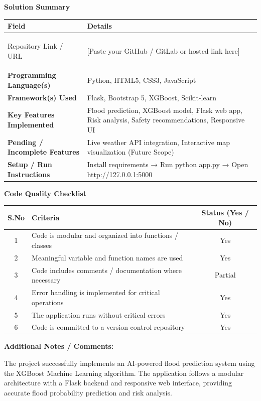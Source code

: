 \documentclass[11pt, a4paper]{article}
\begin{document}
\textbf{Solution Summary}

\noindent
\begin{longtable}{|>{\bfseries}p{}|p{}|}
\hline
Field & \textbf{Details} \\ \hline
\endfirsthead
\endhead %
\endfoot %
\endlastfoot

Repository Link / URL & [Paste your GitHub / GitLab or hosted link here] \\ \hline
Programming Language(s) & Python, HTML5, CSS3, JavaScript \\ \hline
Framework(s) Used & Flask, Bootstrap 5, XGBoost, Scikit-learn \\ \hline
Key Features Implemented & Flood prediction, XGBoost model, Flask web app, Risk analysis, Safety recommendations, Responsive UI \\ \hline
Pending / Incomplete Features & Live weather API integration, Interactive map visualization (Future Scope) \\ \hline
Setup / Run Instructions & Install requirements → Run python app.py → Open http://127.0.0.1:5000 \\ \hline
\end{longtable}

\vspace{1em}

\textbf{Code Quality Checklist}

\noindent
\begin{longtable}{|c|>{\raggedright\arraybackslash}p{}|c|}
\hline
\textbf{S.No} & \textbf{Criteria} & \textbf{Status (Yes / No)} \\ \hline
\endfirsthead
\endhead
\endfoot
\endlastfoot

1 & Code is modular and organized into functions / classes & Yes \\ \hline
2 & Meaningful variable and function names are used & Yes \\ \hline
3 & Code includes comments / documentation where necessary & Partial \\ \hline
4 & Error handling is implemented for critical operations & Yes \\ \hline
5 & The application runs without critical errors & Yes \\ \hline
6 & Code is committed to a version control repository & Yes \\ \hline
\end{longtable}

\vspace{1em}

\textbf{Additional Notes / Comments:}

The project successfully implements an AI-powered flood prediction system using the XGBoost Machine Learning algorithm. The application follows a modular architecture with a Flask backend and responsive web interface, providing accurate flood probability prediction and risk analysis.
\end{document}
